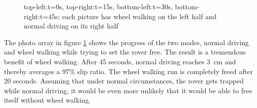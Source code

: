\documentclass[a4paper,twocolumn]{esapub2005} %
\begin{document}
\begin{figure}[h!]
    \centering	
        \caption{top-left:t=0s,  top-right:t=15s, bottom-left:t=30s,
        bottom-right:t=45s; each picture has wheel walking on the left half and
        normal driving on its right half }
    \label{fig:volleysequence}
\end{figure}

The photo array in figure \ref{fig:volleysequence} shows the progress of the
two modes, normal driving and wheel walking while trying to set the rover free.
The result is a tremendous benefit of wheel walking. After 45 seconds, normal
driving reaches 3~\unit{cm} and thereby averages a 97\% slip ratio. The wheel walking
run is completely freed after 20 seconds. Assuming that under normal
circumstances, the rover gets trapped while normal driving, it would be even
more unlikely that it would be able to free itself without wheel walking.
\end{document}

